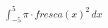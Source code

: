 \documentclass[preview]{standalone}
\begin{document}
\begin{align*}
\int_{-5}^{5}\pi \cdot fresca(x)^{2} \, dx
\end{align*}
\end{document}
